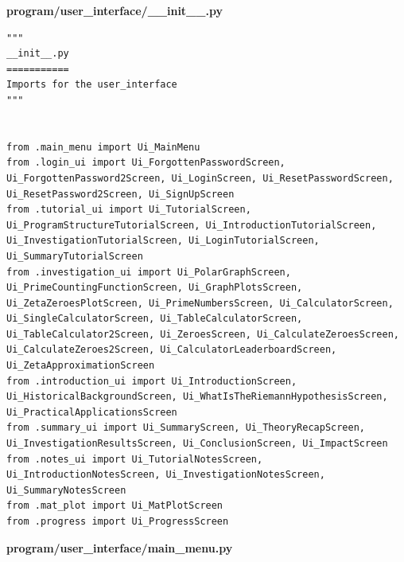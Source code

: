 \documentclass{article}
\begin{document}
\textbf{program/user\_interface/\_\_init\_\_.py}

\begin{lstlisting}
"""
__init__.py
===========
Imports for the user_interface
"""


from .main_menu import Ui_MainMenu
from .login_ui import Ui_ForgottenPasswordScreen, Ui_ForgottenPassword2Screen, Ui_LoginScreen, Ui_ResetPasswordScreen, Ui_ResetPassword2Screen, Ui_SignUpScreen
from .tutorial_ui import Ui_TutorialScreen, Ui_ProgramStructureTutorialScreen, Ui_IntroductionTutorialScreen, Ui_InvestigationTutorialScreen, Ui_LoginTutorialScreen, Ui_SummaryTutorialScreen
from .investigation_ui import Ui_PolarGraphScreen, Ui_PrimeCountingFunctionScreen, Ui_GraphPlotsScreen, Ui_ZetaZeroesPlotScreen, Ui_PrimeNumbersScreen, Ui_CalculatorScreen, Ui_SingleCalculatorScreen, Ui_TableCalculatorScreen, Ui_TableCalculator2Screen, Ui_ZeroesScreen, Ui_CalculateZeroesScreen, Ui_CalculateZeroes2Screen, Ui_CalculatorLeaderboardScreen, Ui_ZetaApproximationScreen
from .introduction_ui import Ui_IntroductionScreen, Ui_HistoricalBackgroundScreen, Ui_WhatIsTheRiemannHypothesisScreen, Ui_PracticalApplicationsScreen
from .summary_ui import Ui_SummaryScreen, Ui_TheoryRecapScreen, Ui_InvestigationResultsScreen, Ui_ConclusionScreen, Ui_ImpactScreen
from .notes_ui import Ui_TutorialNotesScreen, Ui_IntroductionNotesScreen, Ui_InvestigationNotesScreen, Ui_SummaryNotesScreen
from .mat_plot import Ui_MatPlotScreen
from .progress import Ui_ProgressScreen
\end{lstlisting}

\textbf{program/user\_interface/main\_menu.py}
\end{document}
